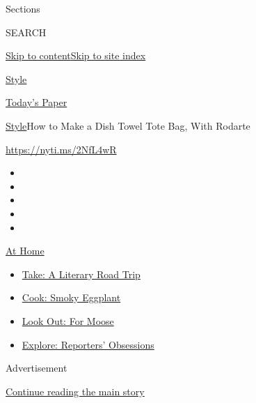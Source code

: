Sections

SEARCH

\protect\hyperlink{site-content}{Skip to
content}\protect\hyperlink{site-index}{Skip to site index}

\href{https://www.nytimes.com/section/style}{Style}

\href{https://myaccount.nytimes.com/auth/login?response_type=cookie\&client_id=vi}{}

\href{https://www.nytimes.com/section/todayspaper}{Today's Paper}

\href{/section/style}{Style}\textbar{}How to Make a Dish Towel Tote Bag,
With Rodarte

\url{https://nyti.ms/2NfL4wR}

\begin{itemize}
\item
\item
\item
\item
\item
\end{itemize}

\href{https://www.nytimes.com/spotlight/at-home?action=click\&pgtype=Article\&state=default\&region=TOP_BANNER\&context=at_home_menu}{At
Home}

\begin{itemize}
\tightlist
\item
  \href{https://www.nytimes.com/2020/07/28/books/time-for-a-literary-road-trip.html?action=click\&pgtype=Article\&state=default\&region=TOP_BANNER\&context=at_home_menu}{Take:
  A Literary Road Trip}
\item
  \href{https://www.nytimes.com/2020/07/29/magazine/bored-with-your-home-cooking-some-smoky-eggplant-will-fix-that.html?action=click\&pgtype=Article\&state=default\&region=TOP_BANNER\&context=at_home_menu}{Cook:
  Smoky Eggplant}
\item
  \href{https://www.nytimes.com/2020/07/27/travel/moose-michigan-isle-royale.html?action=click\&pgtype=Article\&state=default\&region=TOP_BANNER\&context=at_home_menu}{Look
  Out: For Moose}
\item
  \href{https://www.nytimes.com/interactive/2020/at-home/even-more-reporters-editors-diaries-lists-recommendations.html?action=click\&pgtype=Article\&state=default\&region=TOP_BANNER\&context=at_home_menu}{Explore:
  Reporters' Obsessions}
\end{itemize}

Advertisement

\protect\hyperlink{after-top}{Continue reading the main story}

